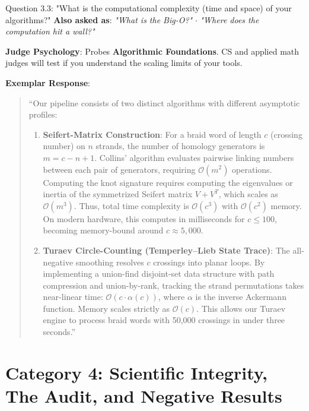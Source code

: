 \documentclass[11pt,letterpaper]{article}
\begin{document}
\vspace{1em}

\begin{questionbox}{Question 3.3: "What is the computational complexity (time and space) of your algorithms?"}
\textbf{Also asked as}: \textit{"What is the Big-O?"} $\cdot$ \textit{"Where does the computation hit a wall?"}
\end{questionbox}

\begin{strategybox}
\textbf{Judge Psychology}: Probes \textbf{Algorithmic Foundations}. CS and applied math judges will test if you understand the scaling limits of your tools.
\end{strategybox}

\begin{exemplarbox}
\textbf{Exemplar Response}:
\begin{quote}
``Our pipeline consists of two distinct algorithms with different asymptotic profiles:
\begin{enumerate}
    \item \textbf{Seifert-Matrix Construction}: For a braid word of length $c$ (crossing number) on $n$ strands, the number of homology generators is $m = c - n + 1$. Collins' algorithm evaluates pairwise linking numbers between each pair of generators, requiring $\mathcal{O}(m^2)$ operations. Computing the knot signature requires computing the eigenvalues or inertia of the symmetrized Seifert matrix $V + V^T$, which scales as $\mathcal{O}(m^3)$. Thus, total time complexity is $\mathcal{O}(c^3)$ with $\mathcal{O}(c^2)$ memory. On modern hardware, this computes in milliseconds for $c \leq 100$, becoming memory-bound around $c \approx 5{,}000$.
    \item \textbf{Turaev Circle-Counting (Temperley--Lieb State Trace)}: The all-negative smoothing resolves $c$ crossings into planar loops. By implementing a union-find disjoint-set data structure with path compression and union-by-rank, tracking the strand permutations takes near-linear time: $\mathcal{O}(c \cdot \alpha(c))$, where $\alpha$ is the inverse Ackermann function. Memory scales strictly as $\mathcal{O}(c)$. This allows our Turaev engine to process braid words with 50,000 crossings in under three seconds.''
\end{enumerate}
\end{quote}
\end{exemplarbox}

\newpage
\section{Category 4: Scientific Integrity, The Audit, and Negative Results}
\end{document}
